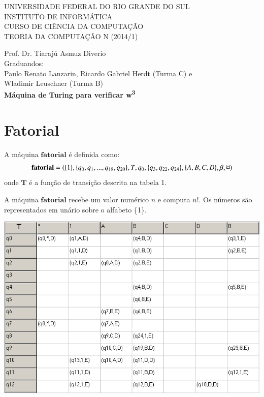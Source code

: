 \documentclass[a4paper]{article}
\begin{document}
\begin{center}


\uppercase{\large Universidade Federal do Rio Grande do Sul\\

\large Instituto de Informática \\

\large Curso de Ciência da Computação \\

\large Teoria da Computação N (2014/1)\\
}

\large Prof. Dr. Tiarajú Asmuz Diverio \\

\large Graduandos: \\ Paulo Renato Lanzarin, Ricardo Gabriel Herdt (Turma C) e \\
	Wladimir Leuschner (Turma B) \\[1cm]

\large \bfseries Máquina de Turing para verificar w\textsuperscript{3} \\[1.0cm]




\end{center}


\section{Fatorial}
A máquina $\mathbf{fatorial}$ é definida como:
\begin{equation*}
\mathbf{fatorial} = (\{1\}, \{q_0, q_1, ..., q_{19}, q_{20}\}, T, q_0,
\{q_3, q_{22}, q_{24}\}, \{A, B, C, D\}, \beta, \text{\textcurrency} )\end{equation*} onde $\mathbf{T}$ é a função de transição descrita na tabela 1.

A máquina $\mathbf{fatorial}$ recebe um valor numérico $n$ e computa $n!$. Os 
números são representados em unário sobre o alfabeto \{1\}. \\[1.0cm]

\begin{table}[h!]
  \centering
  \includegraphics[scale=0.5]{fatorial_1.png}
\end{table}
\end{document}
